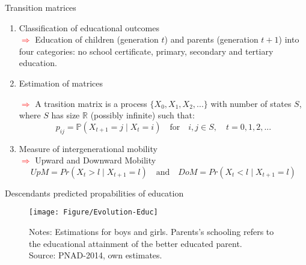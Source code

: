 \documentclass{beamer}
\begin{document}
\begin{frame} {Transition matrices}
\begin{enumerate}
\item{Classification of educational outcomes}
{\\ \footnotesize \textcolor{red}{$\Longrightarrow$} Education of children (generation $t$) and parents (generation $t+1$) into four categories: no school certificate, primary, secondary and tertiary education.}

\vspace{0.3cm}
\item{Estimation of matrices}

{\footnotesize \textcolor{red}{$\Longrightarrow$} A trasition matrix is a process $\{X_0, X_1, X_2, ...\}$ with number of states $S$, where $S$ has size $\mathbb{R}$ (possibly infinite) such that:
\begin{equation} \label{eq:Notation}
p_{ij} = \mathbb{P} (X_{t+1} = j \mid X_t = i) \quad \textrm{for} \quad i, j \in S, \quad t = 0,1,2,...
\end{equation}}



\vspace{-0.2cm}
\item Measure of intergenerational mobility 
\vspace{0cm}
{\\ \footnotesize\textcolor{red}{$\Longrightarrow$} Upward and Downward Mobility
\vspace{0cm}
\begin{equation} \label{eq:UpwardMobility}
UpM = Pr \left(X_t > l \mid X_{t+1} = l \right) \quad \textrm{and} \quad DoM = Pr \left(X_t < l \mid X_{t+1} = l \right)
\end{equation}}

\end{enumerate}
\end{frame}




\begin{frame} {Descendants predicted propabilities of education}
\begin{figure}[htb]
\centering
\texttt{[image: Figure/Evolution-Educ]}
\begin{minipage}{0.84\textwidth} %
{\fontsize{5}{1}\selectfont
\vspace*{-4mm}
Notes: Estimations for boys and girls. Parents's schooling refers to the educational attainment of the better educated parent.\\
Source: PNAD-2014, own estimates.\par}
\end{minipage}
\end{figure}
\end{frame}
\end{document}
